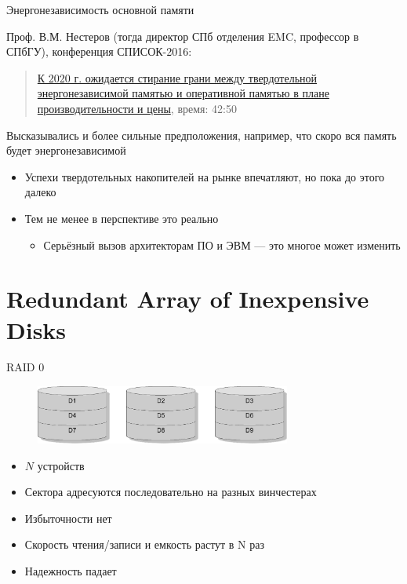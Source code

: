\documentclass[xetex,aspectratio=43]{beamer}
\begin{document}
\begin{frame}[fragile]{Энергонезависимость основной памяти}

    Проф. В.М. Нестеров (тогда директор СПб отделения EMC, профессор в
    СПбГУ), конференция СПИСОК-2016:

    \begin{quote}
        \href{http://spisok.math.spbu.ru/video/2016/4.mp4}{К 2020 г. ожидается стирание грани между твердотельной энергонезависимой памятью и оперативной памятью в плане производительности и цены}, время: 42:50
    \end{quote}

    \pause

    Высказывались и более сильные предположения, например, что скоро вся память будет энергонезависимой

    \begin{itemize}
        \tightlist
        \item
        Успехи твердотельных накопителей на рынке впечатляют, но пока до этого далеко
        \item
        Тем не менее в перспективе это реально

        \begin{itemize}
            \tightlist
            \item
            Серьёзный вызов архитекторам ПО и ЭВМ --- это многое может изменить
        \end{itemize}
    \end{itemize}

\end{frame}

\section{Redundant Array of Inexpensive Disks}


\begin{frame}{RAID 0}
    \begin{figure}
        \includegraphics[width=0.75\textwidth, page=1]{img/10.raids-crop.pdf}
    \end{figure}

\begin{itemize}
\tightlist
\item
  \(N\) устройств
\item
  Сектора адресуются последовательно на разных винчестерах
\item
  Избыточности нет
\item
  Скорость чтения/записи и емкость растут в N раз
\item
  Надежность падает
\end{itemize}
\end{frame}
\end{document}
